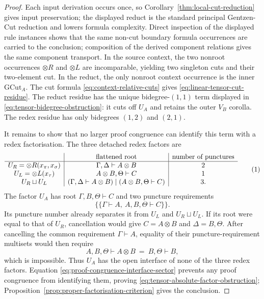 \documentclass[10pt,a4paper]{article}
\theoremstyle{plain}
\theoremstyle{definition}
\theoremstyle{remark}
\newcommand{\ms}{\mathrel{\vdash}}
\newcommand{\fjoin}{\mathbin{\sqcup}}
\newcommand{\eqtag}{\refstepcounter{equation}\tag{\theequation}}
\begin{document}
\begin{proof}
Each input derivation occurs once, so
Corollary~\ref{thm:local-cut-reduction} gives input preservation; the displayed
reduct is the standard principal Gentzen-Cut reduction and lowers formula
complexity.  Direct inspection of the displayed rule instances shows that
the same non-cut boundary formula occurrences are carried to the conclusion;
composition of the derived component relations gives the same component
transport.  In the
source context, the two nonroot occurrences \(\otimes R\) and
\(\otimes L\) are incomparable, yielding two singleton cuts and their
two-element cut.  In the reduct, the only nonroot context occurrence
is the inner \(\mathrm{GCut}_A\).  The cut formula
\eqref{eq:context-relative-cuts} gives
\eqref{eq:linear-tensor-cut-residue}.  The reduct residue has the unique
bidegree-\((1,1)\) term displayed in
\eqref{eq:tensor-bidegree-obstruction}: it cuts off \(U_A\) and retains the
outer \(V_B\) corolla.  The redex residue has only bidegrees \((1,2)\) and
\((2,1)\).

It remains to show that no larger proof congruence can identify this term
with a redex factorisation.  The three detached redex factors are
\[
\begin{array}{c|c|c}
 &\text{flattened root}&\text{number of punctures}\\ \hline
 U_R=\otimes R(x_\pi,x_\sigma)
   &\Gamma,\Delta\ms A\otimes B&2\\
 U_L=\otimes L(x_\tau)
   &A\otimes B,\Theta\ms C&1\\
 U_R\fjoin U_L
   &(\Gamma,\Delta\ms A\otimes B)\mid
     (A\otimes B,\Theta\ms C)&3.
\end{array}
\eqtag\label{eq:tensor-redex-factor-interfaces}
\]
The factor \(U_A\) has root
\(
\Gamma,B,\Theta\ms C
\)
and two puncture requirements
\[
 \bigl\{\!\bigl\{
   \Gamma\ms A,\ A,B,\Theta\ms C
 \bigr\}\!\bigr\}.
\]
Its puncture number already separates it from \(U_L\) and
\(U_R\fjoin U_L\).  If its root were equal to that of \(U_R\), cancellation
would give
\(
C=A\otimes B
\)
and
\(
\Delta=B,\Theta
\).
After cancelling the common requirement \(\Gamma\ms A\), equality of their
puncture-requirement multisets would then require
\[
       A,B,\Theta\ms A\otimes B
       \ =\
       B,\Theta\ms B,
\]
which is impossible.  Thus \(U_A\) has the open interface of none of the
three redex factors.  Equation
\eqref{eq:proof-congruence-interface-sector} prevents any proof congruence
from identifying them, proving
\eqref{eq:tensor-absolute-factor-obstruction};
Proposition~\ref{prop:proper-factorisation-criterion} gives the conclusion.
\end{proof}
\end{document}
